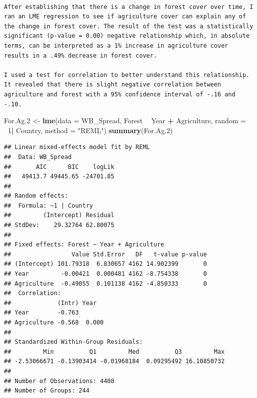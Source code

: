 \documentclass[12pt,]{article}
\newenvironment{Shaded}{\begin{snugshade}}{\end{snugshade}}
\newcommand{\KeywordTok}[1]{\textcolor[rgb]{0.13,0.29,0.53}{\textbf{#1}}}
\newcommand{\DataTypeTok}[1]{\textcolor[rgb]{0.13,0.29,0.53}{#1}}
\newcommand{\DecValTok}[1]{\textcolor[rgb]{0.00,0.00,0.81}{#1}}
\newcommand{\StringTok}[1]{\textcolor[rgb]{0.31,0.60,0.02}{#1}}
\newcommand{\OperatorTok}[1]{\textcolor[rgb]{0.81,0.36,0.00}{\textbf{#1}}}
\newcommand{\NormalTok}[1]{#1}
\begin{document}
\begin{verbatim}

After establishing that there is a change in forest cover over time, I ran an LME regression to see if agriculture cover can explain any of the change in forest cover. The result of the test was a statistically significant (p-value = 0.00) negative relationship which, in absolute terms, can be interpreted as a 1% increase in agriculture cover results in a .49% decrease in forest cover. 

I used a test for correlation to better understand this relationship. It revealed that there is slight negative correlation between agriculture and forest with a 95% confidence interval of -.16 and -.10. 
\end{verbatim}

\begin{Shaded}
\begin{Highlighting}[]
\NormalTok{For.Ag.}\DecValTok{2}\NormalTok{ <-}\StringTok{  }\KeywordTok{lme}\NormalTok{(}\DataTypeTok{data =}\NormalTok{ WB_Spread,}
\NormalTok{              Forest }\OperatorTok{~}\StringTok{ }\NormalTok{Year }\OperatorTok{+}\StringTok{ }\NormalTok{Agriculture,}
              \DataTypeTok{random =} \OperatorTok{~}\DecValTok{1}\OperatorTok{|}\StringTok{ }\NormalTok{Country,}
              \DataTypeTok{method =} \StringTok{"REML"}\NormalTok{)}
\KeywordTok{summary}\NormalTok{(For.Ag.}\DecValTok{2}\NormalTok{)}
\end{Highlighting}
\end{Shaded}

\begin{verbatim}
## Linear mixed-effects model fit by REML
##  Data: WB_Spread 
##       AIC      BIC    logLik
##   49413.7 49445.65 -24701.85
## 
## Random effects:
##  Formula: ~1 | Country
##         (Intercept) Residual
## StdDev:    29.32764 62.80075
## 
## Fixed effects: Forest ~ Year + Agriculture 
##                 Value Std.Error   DF   t-value p-value
## (Intercept) 101.79318  6.830657 4162 14.902399       0
## Year         -0.00421  0.000481 4162 -8.754338       0
## Agriculture  -0.49055  0.101138 4162 -4.850333       0
##  Correlation: 
##             (Intr) Year  
## Year        -0.763       
## Agriculture -0.568  0.000
## 
## Standardized Within-Group Residuals:
##         Min          Q1         Med          Q3         Max 
## -2.53066671 -0.13903414 -0.01968184  0.09295492 16.10850732 
## 
## Number of Observations: 4408
## Number of Groups: 244
\end{verbatim}
\end{document}
